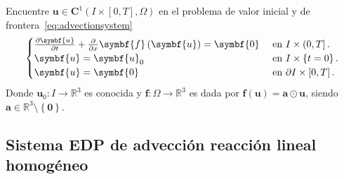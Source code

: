 Encuentre
\begin{math}
	\symbf{u}\in
	\symbf{C}^{1}\left(I\times\left[0,T\right],\Omega\right)
\end{math}
en el problema de valor inicial y de frontera~\eqref{eq:advectionsystem}
\begin{equation}\label{eq:advectionsystem}
	\begin{cases}
		\diffp{\symbf{u}}{t}+\diffp{}{x}\symbf{f}\left(\symbf{u}\right)=
		\symbf{0}     &
		\text{ en }I\times\left(0,T\right].   \\
		\symbf{u}                                                      =
		\symbf{u}_{0} &
		\text{ en }I\times\left\{t=0\right\}. \\
		\symbf{u}                                                      =
		\symbf{0}     &
		\text{ en }\partial I\times\left[0,T\right].
	\end{cases}
\end{equation}
Donde
\begin{math}
	\symbf{u}_{0}\colon I\to
	\mathbb{R}^{3}
\end{math}
es conocida y
\begin{math}
	\symbf{f}\colon\Omega\to
	\mathbb{R}^{3}
\end{math}
es dada por
\begin{math}
	\symbf{f}\left(\symbf{u}\right)=
	\symbf{a}\odot\symbf{u}
\end{math},
siendo $\symbf{a}\in\mathbb{R}^{3}\setminus\left\{\symbf{0}\right\}$.

\subsection*{Sistema EDP de advección reacción lineal homogéneo}

